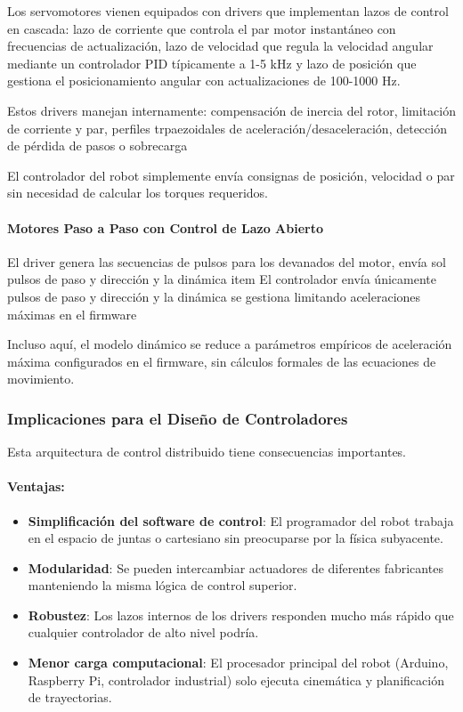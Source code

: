 Los servomotores vienen equipados con drivers que implementan lazos de control en cascada: lazo de corriente que controla el par motor instantáneo con frecuencias de actualización, lazo de velocidad que regula la velocidad angular mediante un controlador PID típicamente a 1-5 kHz y lazo de posición que gestiona el posicionamiento angular con actualizaciones de 100-1000 Hz.

Estos drivers manejan internamente: compensación de inercia del rotor, limitación de corriente y par, perfiles trpaezoidales de aceleración/desaceleración, detección de pérdida de pasos o sobrecarga

El controlador del robot simplemente envía consignas de posición, velocidad o par sin necesidad de calcular los torques requeridos.

\paragraph{Motores Paso a Paso con Control de Lazo Abierto}

El driver genera las secuencias de pulsos para los devanados del motor, envía sol pulsos de paso y dirección y la dinámica item El controlador envía únicamente pulsos de paso y dirección y la dinámica se gestiona limitando aceleraciones máximas en el firmware

Incluso aquí, el modelo dinámico se reduce a parámetros empíricos de aceleración máxima configurados en el firmware, sin cálculos formales de las ecuaciones de movimiento.

\subsubsection{Implicaciones para el Diseño de Controladores}

Esta arquitectura de control distribuido tiene consecuencias importantes.

\paragraph{Ventajas:}

\begin{itemize}
    \item \textbf{Simplificación del software de control}: El programador del robot trabaja en el espacio de juntas o cartesiano sin preocuparse por la física subyacente.
    
    \item \textbf{Modularidad}: Se pueden intercambiar actuadores de diferentes fabricantes manteniendo la misma lógica de control superior.
    
    \item \textbf{Robustez}: Los lazos internos de los drivers responden mucho más rápido que cualquier controlador de alto nivel podría.
    
    \item \textbf{Menor carga computacional}: El procesador principal del robot (Arduino, Raspberry Pi, controlador industrial) solo ejecuta cinemática y planificación de trayectorias.
\end{itemize}

